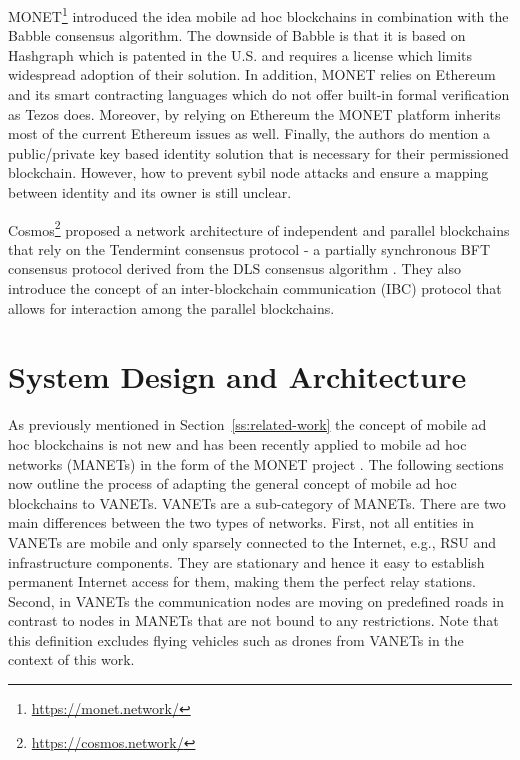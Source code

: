 \documentclass{llncs}
\begin{document}
{			MONET\footnote{\url{https://monet.network/}} \cite{monetWhitepaper} introduced the idea mobile ad hoc blockchains in combination with the Babble consensus algorithm. The downside of Babble is that it is based on Hashgraph \cite{hashgraphWhitepaper} which is patented in the U.S. and requires a license which limits widespread adoption of their solution. In addition, MONET relies on Ethereum and its smart contracting languages which do not offer built-in formal verification as Tezos does. Moreover, by relying on Ethereum the MONET platform inherits most of the current Ethereum issues as well. Finally, the authors do mention a public/private key based identity solution that is necessary for their permissioned blockchain. However, how to prevent sybil node attacks and ensure a mapping between identity and its owner is still unclear.

			Cosmos\footnote{\url{https://cosmos.network/}} \cite{cosmosWhitepaper} proposed a network architecture of independent and parallel blockchains that rely on the Tendermint consensus protocol - a partially synchronous BFT consensus protocol derived from the DLS consensus algorithm \cite{dwork1988consensus}. They also introduce the concept of an inter-blockchain communication (IBC) protocol that allows for interaction among the parallel blockchains.
			


	\section{System Design and Architecture}
		\label{s:section-3}
		
		
		As previously mentioned in Section~\ref{ss:related-work} the concept of mobile ad hoc blockchains is not new and has been recently applied to mobile ad hoc networks (MANETs) in the form of the MONET project \cite{monetWhitepaper}. The following sections now outline the process of adapting the general concept of mobile ad hoc blockchains to VANETs. VANETs are a sub-category of MANETs. There are two main differences between the two types of networks. First, not all entities in VANETs are mobile and only sparsely connected to the Internet, e.g., RSU and infrastructure components. They are stationary and hence it easy to establish permanent Internet access for them, making them the perfect relay stations. Second, in VANETs the communication nodes are moving on predefined roads in contrast to nodes in MANETs that are not bound to any restrictions. Note that this definition excludes flying vehicles such as drones from VANETs in the context of this work.  
		
}
\end{document}
